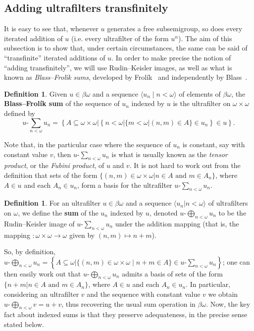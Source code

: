 \documentclass[10pt]{amsart}
\newcommand{\usum}[2]{#1\text{-}\sum_{#2<\omega}}
\newcommand{\uadd}[2]{#1\text{-}\bigoplus_{#2<\omega}}
\newcommand{\sub}{\subseteq}
\theoremstyle{definition}
\newtheorem{definition}[theorem]{Definition}
\theoremstyle{remark}
\begin{document}
\subsection{Adding ultrafilters transfinitely}

It is easy to see that, whenever $u$ generates a free subsemigroup, so does every iterated addition of $u$ (i.e. every ultrafilter of the form $u^n$). The aim of this subsection is to show that, under certain circumstances, the same can be said of ``transfinite'' iterated additions of $u$. In order to make precise the notion of ``adding transfinitely'', we will use Rudin--Keisler images, as well as what is known as {\it Blass--Frol\'{\i}k sums}, developed by Frolík~\cite{frolik} and independently by Blass~\cite[Chapter IV]{blass-thesis}.

\begin{definition}
     Given $u\in\beta\omega$ and a sequence $\langle u_n\mid n<\omega\rangle$ of elements of $\beta\omega$, the {\bf Blass--Frolík sum} of the sequence of $u_n$ indexed by $u$ is the ultrafilter on $\omega\times\omega$ defined by
     \begin{equation*}
         \usum{u}{n}u_n=\left\{A\sub\omega\times\omega\big|\left\{n<\omega\big|\{m<\omega\big|(n,m)\in A\}\in u_n\right\}\in u\right\}.
     \end{equation*}
\end{definition}

Note that, in the particular case where the sequence of $u_n$ is constant, say with constant value $v$, then $\usum{u}{n}u_n$ is what is usually known as the {\it tensor product}, or the {\it Fubini product}, of $u$ and $v$. It is not hard to work out from the definition that sets of the form $\{(n,m)\in\omega\times\omega\big|n\in A\text{ and } m\in A_n\} $, where $A\in u$ and each $A_n\in u_n$, form a basis for the ultrafilter $\usum{u}{n}u_n$.

\begin{definition}
     \label{def:imagenrksuma}
   For an ultrafilter $u\in\beta\omega$ and a sequence $\langle u_n\big| n<\omega\rangle$ of ultrafilters on $\omega$, we define the {\bf sum} of the $u_n$ indexed by $u$, denoted $\uadd{u}{n}u_n$ to be the Rudin--Keisler image of $\usum{u}{n}{u_n}$ under the addition mapping (that is, the mapping $:\omega\times\omega\longrightarrow\omega$ given by $(n,m)\longmapsto n+m$).
\end{definition}

So, by definition, $\uadd{u}{n}u_n=\left\{A\subseteq\omega\big|\{(n,m)\in\omega\times\omega\mid n+m\in A\}\in\usum{u}{n}u_n\right\}$; one can then easily work out that $\uadd{u}{n}u_n$ admits a basis of sets of the form $\{n+m\big|n\in A\text{ and } m\in A_n\} $, where $A\in u$ and each $A_n\in u_n$. In particular, considering an ultrafilter $v$ and the sequence with constant value $v$ we obtain $\uadd{u}{n}{v}=u+v$, thus recovering the usual sum operation in $\beta\omega$. Now, the key fact about indexed sums is that they preserve adequateness, in the precise sense stated below.
\end{document}

